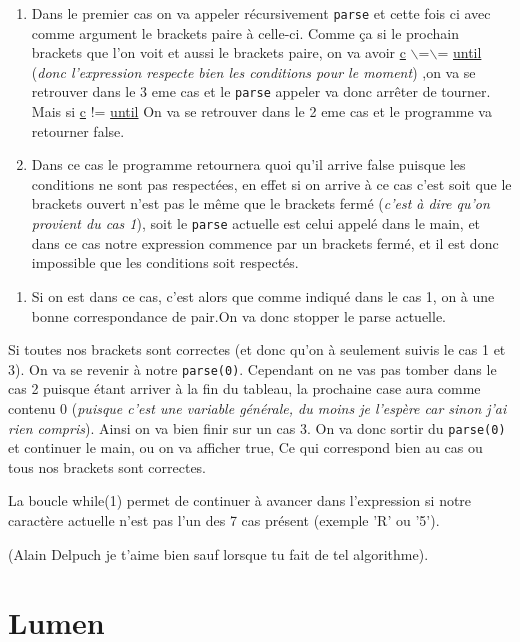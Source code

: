 \documentclass[11pt]{article}
\begin{document}
\begin{enumerate}
\item Dans le premier cas on va appeler récursivement \texttt{parse} et cette fois ci avec comme argument le brackets paire à celle-ci. Comme ça si le prochain brackets que l'on voit et aussi le brackets paire, on va avoir \uline{c} $\backslash$=$\backslash$= \uline{until} (\emph{donc l'expression respecte bien les conditions pour le moment}) ,on va se retrouver dans le 3 eme cas  et le \texttt{parse} appeler va donc arrêter de tourner. Mais si \uline{c} != \uline{until} On va se retrouver dans le 2 eme cas et le programme va retourner false.

\item Dans ce cas le programme retournera quoi qu'il arrive false puisque les conditions ne sont pas respectées, en effet si on arrive à ce cas c'est soit que le brackets ouvert n'est pas le même que le brackets fermé (\emph{c'est à dire qu'on provient du cas 1}), soit le \texttt{parse} actuelle est celui appelé dans le main, et dans ce cas notre expression commence par un brackets fermé, et il est donc impossible que les conditions soit respectés.
\end{enumerate}


\begin{enumerate}
\item Si on est dans ce cas, c'est alors que comme indiqué dans le cas 1, on à une bonne correspondance de pair.On va donc stopper le parse actuelle.
\end{enumerate}

Si toutes nos brackets sont correctes (et donc qu'on à seulement suivis le cas 1 et 3). On va se revenir à notre \texttt{parse(0)}. Cependant on ne vas pas tomber dans le cas 2 puisque étant arriver à la fin du tableau, la prochaine case aura comme contenu 0 (\emph{puisque c'est une variable générale, du moins je l'espère car sinon j'ai rien compris}). Ainsi on va bien finir sur un cas 3. On va donc sortir du \texttt{parse(0)} et continuer le main, ou on va afficher true, Ce qui correspond bien au cas ou tous nos brackets sont correctes.

La boucle while(1) permet de continuer à avancer dans l'expression si notre caractère actuelle n'est pas l'un des 7 cas présent (exemple 'R' ou '5').

(Alain Delpuch je t'aime bien sauf lorsque tu fait de tel algorithme).



\section{Lumen}
\label{sec:org1f9ed0b}
\end{document}
